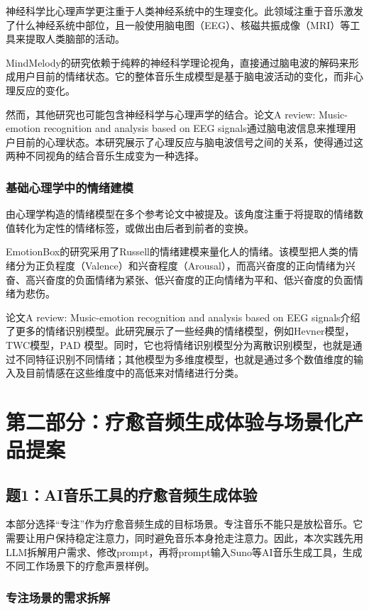 \documentclass[12pt, fontset=windows]{ctexart}
\begin{document}
神经科学比心理声学更注重于人类神经系统中的生理变化。此领域注重于音乐激发了什么神经系统中部位，且一般使用脑电图（EEG）、核磁共振成像（MRI）等工具来提取人类脑部的活动。

MindMelody的研究依赖于纯粹的神经科学理论视角，直接通过脑电波的解码来形成用户目前的情绪状态。它的整体音乐生成模型是基于脑电波活动的变化，而非心理反应的变化。

然而，其他研究也可能包含神经科学与心理声学的结合。论文A review: Music-emotion recognition and analysis based on EEG signals通过脑电波信息来推理用户目前的心理状态。本研究展示了心理反应与脑电波信号之间的关系，使得通过这两种不同视角的结合音乐生成变为一种选择。

\subsubsection{基础心理学中的情绪建模}

由心理学构造的情绪模型在多个参考论文中被提及。该角度注重于将提取的情绪数值转化为定性的情绪标签，或做出由后者到前者的变换。

EmotionBox的研究采用了Russell的情绪建模来量化人的情绪。该模型把人类的情绪分为正负程度（Valence）和兴奋程度（Arousal），而高兴奋度的正向情绪为兴奋、高兴奋度的负面情绪为紧张、低兴奋度的正向情绪为平和、低兴奋度的负面情绪为悲伤。

论文A review: Music-emotion recognition and analysis based on EEG signals介绍了更多的情绪识别模型。此研究展示了一些经典的情绪模型，例如Hevner模型，TWC模型，PAD 模型。同时，它也将情绪识别模型分为离散识别模型，也就是通过不同特征识别不同情绪；其他模型为多维度模型，也就是通过多个数值维度的输入及目前情感在这些维度中的高低来对情绪进行分类。

\newpage
\section{第二部分：疗愈音频生成体验与场景化产品提案}

\subsection{题1：AI音乐工具的疗愈音频生成体验}

本部分选择“专注”作为疗愈音频生成的目标场景。专注音乐不能只是放松音乐。它需要让用户保持稳定注意力，同时避免音乐本身抢走注意力。因此，本次实践先用LLM拆解用户需求、修改prompt，再将prompt输入Suno等AI音乐生成工具，生成不同工作场景下的疗愈声景样例。

\subsubsection{专注场景的需求拆解}
\end{document}
